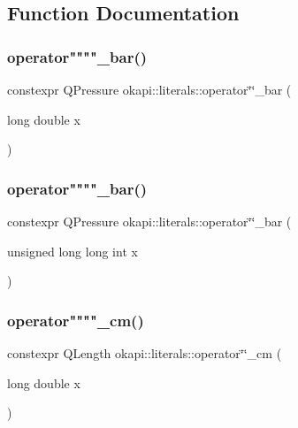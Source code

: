 \subsection{Function Documentation}
\mbox{\label{namespaceokapi_1_1literals_a0c2d73023291966566c98c439789d640}} 
\subsubsection{\texorpdfstring{operator""""\_bar()}{operator""\_bar()}\hspace{0.1cm}{\footnotesize\ttfamily [1/2]}}
{\footnotesize\ttfamily constexpr Q\+Pressure okapi\+::literals\+::operator\char`\"{}\char`\"{}\+\_\+bar (\begin{DoxyParamCaption}\item[{long double}]{x }\end{DoxyParamCaption})}

\mbox{\label{namespaceokapi_1_1literals_aa470b7c898aa5dce28e67d3b095ee683}} 
\subsubsection{\texorpdfstring{operator""""\_bar()}{operator""\_bar()}\hspace{0.1cm}{\footnotesize\ttfamily [2/2]}}
{\footnotesize\ttfamily constexpr Q\+Pressure okapi\+::literals\+::operator\char`\"{}\char`\"{}\+\_\+bar (\begin{DoxyParamCaption}\item[{unsigned long long int}]{x }\end{DoxyParamCaption})}

\mbox{\label{namespaceokapi_1_1literals_ad8a0c1bc6292d7bab8ead5d70663c34f}} 
\subsubsection{\texorpdfstring{operator""""\_cm()}{operator""\_cm()}\hspace{0.1cm}{\footnotesize\ttfamily [1/2]}}
{\footnotesize\ttfamily constexpr Q\+Length okapi\+::literals\+::operator\char`\"{}\char`\"{}\+\_\+cm (\begin{DoxyParamCaption}\item[{long double}]{x }\end{DoxyParamCaption})}

